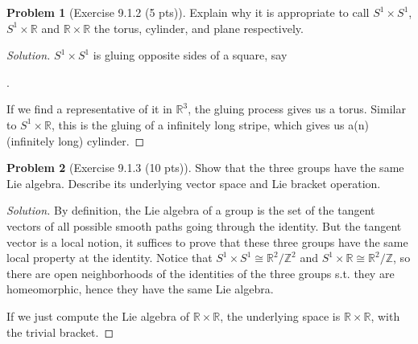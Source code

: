 \documentclass{article}
\theoremstyle{definition}
\newtheorem{problem}{Problem}
\theoremstyle{plain}
\begin{document}
\begin{problem}[Exercise 9.1.2 (5 pts)]
Explain why it is appropriate to call $S^1\times S^1$, $S^1\times\mathbb{R}$ and $\mathbb{R}\times\mathbb{R}$ the torus, cylinder, and plane respectively.
\end{problem}
\begin{adjustwidth}{0.7cm}{}
\color{blue}
\begin{proof}[Solution]
$S^1\times S^1$ is gluing opposite sides of a square, say
\begin{center}
.
\end{center}
If we find a representative of it in $\mathbb{R}^3$, the gluing process gives us a torus. Similar to $S^1\times\mathbb{R}$, this is the gluing of a infinitely long stripe, which gives us a(n) (infinitely long) cylinder.
\color{black}
\end{proof}
\end{adjustwidth}

\begin{problem}[Exercise 9.1.3 (10 pts)]
Show that the three groups have the same Lie algebra. Describe its underlying vector space and Lie bracket operation.
\end{problem}
\begin{adjustwidth}{0.7cm}{}
\color{blue}
\begin{proof}[Solution]
By definition, the Lie algebra of a group is the set of the tangent vectors of all possible smooth paths going through the identity. But the tangent vector is a local notion, it suffices to prove that these three groups have the same local property at the identity. Notice that $S^1\times S^1\cong\mathbb{R}^2/\mathbb{Z}^2$ and $S^1\times\mathbb{R}\cong\mathbb{R}^2/\mathbb{Z}$, so there are open neighborhoods of the identities of the three groups s.t. they are homeomorphic, hence they have the same Lie algebra.\par
If we just compute the Lie algebra of $\mathbb{R}\times\mathbb{R}$, the underlying space is $\mathbb{R}\times\mathbb{R}$, with the trivial bracket.
\color{black}
\end{proof}
\end{adjustwidth}
\end{document}
